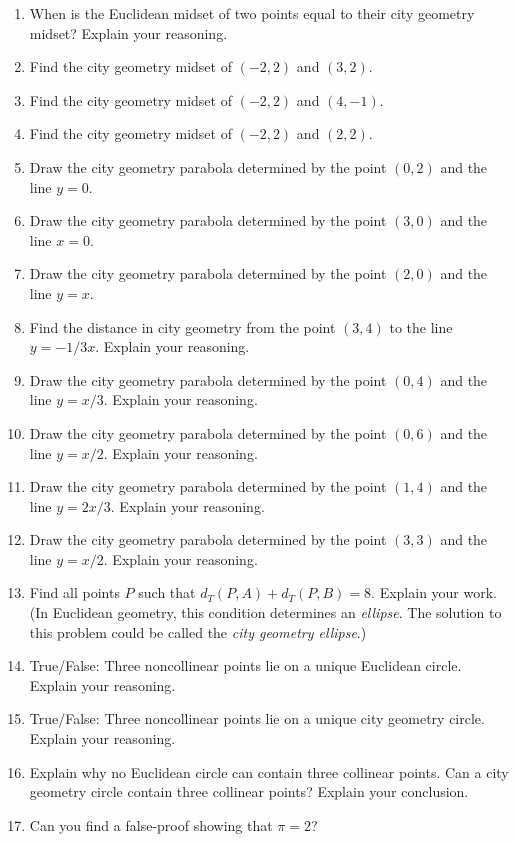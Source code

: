 \begin{problems}
\begin{enumerate}
\item When is the Euclidean midset of two points equal to their city
  geometry midset? Explain your reasoning.
\item Find the city geometry midset of $(-2,2)$ and $(3,2)$.
\item Find the city geometry midset of $(-2,2)$ and $(4,-1)$.
\item Find the city geometry midset of $(-2,2)$ and $(2,2)$.
\item Draw the city geometry parabola determined by the point $(0,2)$
  and the line $y=0$.
\item Draw the city geometry parabola determined by the point $(3,0)$
  and the line $x=0$.
\item Draw the city geometry parabola determined by the point $(2,0)$ and
the line $y=x$.
\item Find the distance in city geometry from the point $(3,4)$ to the
  line $y = -1/3x$. Explain your reasoning. 
\item Draw the city geometry parabola determined by the point $(0,4)$
  and the line $y=x/3$. Explain your reasoning. 
\item Draw the city geometry parabola determined by the point $(0,6)$
  and the line $y=x/2$. Explain your reasoning. 
\item Draw the city geometry parabola determined by the point $(1,4)$
  and the line $y=2x/3$. Explain your reasoning. 
\item Draw the city geometry parabola determined by the point $(3,3)$
  and the line $y=x/2$. Explain your reasoning. 
\item Find all points $P$ such that $d_T(P,A)+d_T(P,B)=8$. Explain
  your work. (In Euclidean geometry, this condition determines an
  \textit{ellipse}. The solution to this problem could be called the
  \emph{city geometry ellipse}.)

\item True/False: Three noncollinear points lie on a unique Euclidean
  circle. Explain your reasoning.
\item True/False: Three noncollinear points lie on a unique city geometry
  circle. Explain your reasoning.

\item Explain why no Euclidean circle can contain three collinear
  points. Can a city geometry circle contain three collinear points? Explain
  your conclusion.

\item Can you find a false-proof showing that $\pi = 2$?


\end{enumerate}
\end{problems}

